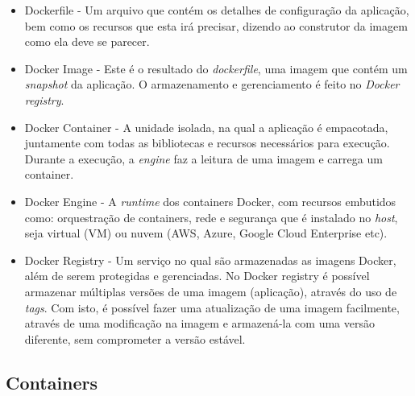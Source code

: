 \documentclass[twoside,english,brazilian]{UNISINOSartigo}
\begin{document}
\begin{itemize}
	\item Dockerfile - Um arquivo que contém os detalhes de configuração da aplicação, bem como os recursos que esta irá precisar, dizendo ao construtor da imagem como ela deve se parecer.
	\item Docker Image - Este é o resultado do \textit{dockerfile}, uma imagem que contém um \textit{snapshot} da aplicação. O armazenamento e gerenciamento é feito no \textit{Docker registry}.
	\item Docker Container - A unidade isolada, na qual a aplicação é empacotada, juntamente com todas as bibliotecas e recursos necessários para execução. Durante a execução, a \textit{engine} faz a leitura de  uma imagem e carrega um container.
	\item Docker Engine - A \textit{runtime} dos containers Docker, com recursos embutidos como: orquestração de containers, rede  e segurança que é instalado no \textit{host}, seja virtual (VM) ou nuvem (AWS, Azure, Google Cloud Enterprise etc).
	\item Docker Registry - Um serviço no qual são armazenadas as imagens Docker, além de serem protegidas e gerenciadas. No Docker registry é possível armazenar múltiplas versões de uma imagem (aplicação), através do uso de \textit{tags}. Com isto, é possível fazer uma atualização de uma imagem facilmente, através de uma modificação na imagem e armazená-la com uma versão diferente, sem comprometer a versão estável.
\end{itemize} 

\subsection{Containers}
\end{document}
